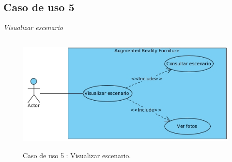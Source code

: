 \newpage
\subsection{Caso de uso 5}\textit{Visualizar escenario} 
\vspace{5mm}
\begin{figure}[h!]
	\centering
	\includegraphics[width=12cm,height=6cm]{imagenes/analisis/visualizarEscenario.jpg}
	\caption{Caso de uso 5 : Visualizar escenario.}
	\label{fig:analogo}
\end{figure}